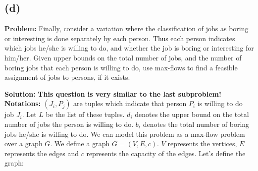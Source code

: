 \documentclass[11pt, fleqn]{article}
\begin{document}
\newpage

\subsection*{(d)}
\textbf{Problem: } Finally, consider a variation where the classification of jobs as boring or interesting is done separately by each person. Thus each person indicates which jobs he/she is willing to do, and whether the job is boring or interesting for him/her. Given upper bounds on the total number of jobs, and the number of boring jobs that each person is willing to do, use max-flows to find a feasible assignment of jobs to persons, if it exists.

\bigskip

\textbf{Solution: } \textbf{This question is very similar to the last subproblem!} \textbf{Notations: } $(J_i,P_j)$ are tuples which indicate that person $P_i$ is willing to do job $J_i$. Let $L$ be the list of these tuples. $d_i$ denotes the upper bound on the total number of jobs the person is willing to do. $b_i$ denotes the total number of boring jobs he/she is willing to do. We can model this problem as a max-flow problem over a graph $G$. We define a graph $G = (V,E,c)$. $V$ represents the vertices, $E$ represents the edges and $c$ represents the capacity of the edges. Let's define the graph:
\end{document}
